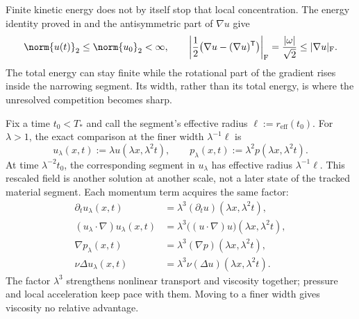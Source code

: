 Finite kinetic energy does not by itself stop that local concentration. The energy identity proved in  and the antisymmetric part of $\nabla u$ give
\[
  \norm{u(t)}_2
  \leq
  \norm{u_0}_2
  <\infty,
  \qquad
  \left|\frac12\bigl(\nabla u-(\nabla u)^{\mathsf T}\bigr)\right|_{\mathrm F}
  =
  \frac{|\omega|}{\sqrt2}
  \leq
  |\nabla u|_{\mathrm F}.
\]
The total energy can stay finite while the rotational part of the gradient rises inside the narrowing segment. Its width, rather than its total energy, is where the unresolved competition becomes sharp.


Fix a time $t_0<T_*$ and call the segment's effective radius $\ell:=r_{\mathrm{eff}}(t_0)$. For $\lambda>1$, the exact \NavierStokes{} comparison at the finer width $\lambda^{-1}\ell$ is
\[
  u_\lambda(x,t)
  :=
  \lambda u(\lambda x,\lambda^2t),
  \qquad
  p_\lambda(x,t)
  :=
  \lambda^2p(\lambda x,\lambda^2t).
\]
At time $\lambda^{-2}t_0$, the corresponding segment in $u_\lambda$ has effective radius $\lambda^{-1}\ell$. This rescaled field is another solution at another scale, not a later state of the tracked material segment. Each momentum term acquires the same factor:
\[
\begin{aligned}
  \partial_tu_\lambda(x,t)
  &=
  \lambda^3(\partial_tu)(\lambda x,\lambda^2t),
  \\
  (u_\lambda\cdot\nabla)u_\lambda(x,t)
  &=
  \lambda^3\bigl((u\cdot\nabla)u\bigr)(\lambda x,\lambda^2t),
  \\
  \nabla p_\lambda(x,t)
  &=
  \lambda^3(\nabla p)(\lambda x,\lambda^2t),
  \\
  \nu\Delta u_\lambda(x,t)
  &=
  \lambda^3\nu(\Delta u)(\lambda x,\lambda^2t).
\end{aligned}
\]
The factor $\lambda^3$ strengthens nonlinear transport and viscosity together; pressure and local acceleration keep pace with them. Moving to a finer width gives viscosity no relative advantage.


